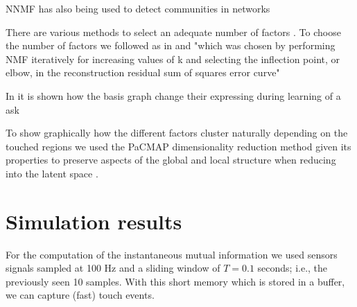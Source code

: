 NNMF has also being used to detect communities in networks \cite{Wang2011Communitydiscoveryusing,Luo2021Symmetricnonnegativematrix}


There are various methods to select an adequate number of factors \cite{Muzzarelli2019RankSelectionNon}. To choose the number of factors we followed as in \cite{Phalen2020Nonnegativematrix} and "which was chosen by performing NMF iteratively for increasing values of k and selecting the inflection point, or elbow, in the reconstruction residual sum of squares
error curve"

In \cite{Stiso2020Learningbraincomputer} it is shown how the basis graph change their expressing during learning of a ask


To show graphically how the different factors cluster naturally depending on the touched regions we used the PaCMAP dimensionality reduction method \cite{Wang2021Understandinghowdimension} given its properties to preserve aspects of the global and local structure when reducing into the latent space \cite{Huang2022Towardscomprehensiveevaluation}.
\section{Simulation results}
\TODO
For the computation of the instantaneous mutual information we used sensors signals sampled at 100 Hz and a sliding window of $T = 0.1$ seconds; i.e., the previously seen 10 samples. With this short memory which is stored in a buffer, we can capture (fast) touch events.

